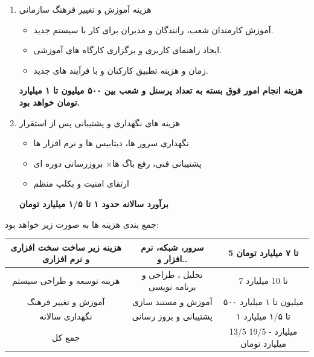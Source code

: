 \documentclass[12pt,a4paper]{report}
\begin{document}
\begin{enumerate}
\begin{itemize}
	\item  
	طراحی سیستم جدید
	\begin{itemize}
		\item	
		طراحی بانک اطلاعاتی، رابط کاربردی ، ماژول های اصلی (ثبت سفارش، مدیریت ناوگان، رهگیری و....)
	\end{itemize}
	\item 
برنامه نویسی و پیاده سازی نرم افزار
	\item 
تست و عیب یابی سیتم قبل از بهره وری
\end{itemize}	
\textbf{
با در نظر گرفتن نیروی فنی، طراح سیستم و تحلیل گر داده، هزینه توسعه بر روی بستر فعلی بین ۳ تا ۴ میلیارد هزینه خواهد داشت.
}
	\item هزینه آموزش و تغییر فرهنگ سازمانی
\begin{itemize}
	\item 
آموزش کارمندان شعب، رانندگان و مدیران برای کار با سیستم جدید.	
	\item 
ایجاد راهنمای کاربری و برگزاری کارگاه های آموزشی.
	\item 
زمان و هزینه تطبیق کارکنان و با فرآیند های جدید.
\end{itemize}	
\textbf{
هزینه انجام امور فوق بسته به تعداد پرسنل و شعب بین ۵۰۰ میلیون تا ۱ میلیارد تومان خواهد بود.
}
\newpage
	\item هزینه های نگهداری و پشتیبانی  پس از استقرار
\begin{itemize}
	\item 
نگهداری سرور ها، دیتابیس ها و نرم افزار ها
	\item 
پشتیبانی فنی، رفع باگ ها× بروزرسانی دوره ای
	\item 
ارتقای امنیت و بکلپ منظم
\end{itemize}	
\textbf{
برآورد سالانه حدود ۱ تا ۱/۵ میلیارد تومان 
}
\end{enumerate}

جمع بندی هزینه ها به صورت زیر خواهد بود:
\begin{center}
\begin{tabular}{|c|c|c|}
\hline
 هزینه زیر ساخت سخت افزاری و نرم افزاری& سرور، شبکه، نرم افزار و..& 5 تا ۷ میلیارد تومان \\
\hline
هزینه توسعه و طراحی سیستم & تحلیل ، طراحی و برنامه نویسی & 7 تا 10 میلیارد\\
\hline
آموزش و تغییر فرهنگ & آموزش و مستند سازی & ۵۰۰ میلیون تا ۱ میلیارد \\
\hline
نگهداری سالانه & پشتیبانی و بروز رسانی  & ‍۱ تا ۱/۵ میلیارد \\
\hline
جمع کل &    & 13/5 میلیارد - 19/5 میلیارد تومان \\
\hline
\end{tabular}
\end{center}
\end{document}
